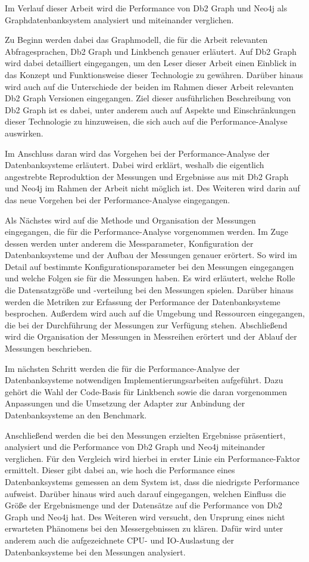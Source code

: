 Im Verlauf dieser Arbeit wird die Performance von Db2 Graph und Neo4j als Graphdatenbanksystem analysiert und miteinander verglichen. 

Zu Beginn werden dabei das Graphmodell, die für die Arbeit relevanten Abfragesprachen, Db2 Graph und Linkbench genauer erläutert. Auf Db2 Graph wird dabei detailliert eingegangen, um den Leser dieser Arbeit einen Einblick in das Konzept und Funktionsweise dieser Technologie zu gewähren. Darüber hinaus wird auch auf die Unterschiede der beiden im Rahmen dieser Arbeit relevanten Db2 Graph Versionen eingegangen. Ziel dieser ausführlichen Beschreibung von Db2 Graph ist es dabei, unter anderem auch auf Aspekte und Einschränkungen dieser Technologie zu hinzuweisen, die sich auch auf die Performance-Analyse auswirken.

Im Anschluss daran wird das Vorgehen bei der Performance-Analyse der Datenbanksysteme erläutert. Dabei wird erklärt, weshalb die eigentlich angestrebte Reproduktion der Messungen und Ergebnisse aus \cite{sigmod_tian} mit Db2 Graph und Neo4j im Rahmen der Arbeit nicht möglich ist. Des Weiteren wird darin auf das neue Vorgehen bei der Performance-Analyse eingegangen. 

Als Nächstes wird auf die Methode und Organisation der Messungen eingegangen, die für die Performance-Analyse vorgenommen werden. Im Zuge dessen werden unter anderem die Messparameter, Konfiguration der Datenbanksysteme und der Aufbau der Messungen genauer erörtert. So wird im Detail auf bestimmte Konfigurationsparameter bei den Messungen eingegangen und welche Folgen sie für die Messungen haben. Es wird erläutert, welche Rolle die Datensatzgröße und -verteilung bei den Messungen spielen. Darüber hinaus werden die Metriken zur Erfassung der Performance der Datenbanksysteme besprochen. Außerdem wird auch auf die Umgebung und Ressourcen eingegangen, die bei der Durchführung der Messungen zur Verfügung stehen. Abschließend wird die Organisation der Messungen in Messreihen erörtert und der Ablauf der Messungen beschrieben.  

Im nächsten Schritt werden die für die Performance-Analyse der Datenbanksysteme notwendigen Implementierungsarbeiten aufgeführt. Dazu gehört die Wahl der Code-Basis für Linkbench sowie die daran vorgenommen Anpassungen und die Umsetzung der Adapter zur Anbindung der Datenbanksysteme an den Benchmark. 

Anschließend werden die bei den Messungen erzielten Ergebnisse präsentiert, analysiert und die Performance von Db2 Graph und Neo4j miteinander verglichen. Für den Vergleich wird hierbei in erster Linie ein Performance-Faktor ermittelt. Dieser gibt dabei an, wie hoch die Performance eines Datenbanksystems gemessen an dem System ist, dass die niedrigste Performance aufweist. Darüber hinaus wird auch darauf eingegangen, welchen Einfluss die Größe der Ergebnismenge und der Datensätze auf die Performance von Db2 Graph und Neo4j hat. Des Weiteren wird versucht, den Ursprung eines nicht erwarteten Phänomens bei den Messergebnissen zu klären. Dafür wird unter anderem auch die aufgezeichnete CPU- und IO-Auslastung der Datenbanksysteme bei den Messungen analysiert.